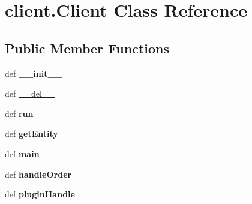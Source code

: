 \hypertarget{classclient_1_1_client}{\section{client.\-Client \-Class \-Reference}
\label{classclient_1_1_client}
}
\subsection*{\-Public \-Member \-Functions}
\begin{DoxyCompactItemize}
\item 
\hypertarget{classclient_1_1_client_a02d35b9c722c0434fda44d8b67274f8b}{def {\bfseries \-\_\-\-\_\-init\-\_\-\-\_\-}}\label{classclient_1_1_client_a02d35b9c722c0434fda44d8b67274f8b}

\item 
def \hyperlink{classclient_1_1_client_a81808356345d9f5b1c37200ce09a03cf}{\-\_\-\-\_\-del\-\_\-\-\_\-}
\item 
\hypertarget{classclient_1_1_client_a611a6aa5f1b60a60270b1cacc3522cb8}{def {\bfseries run}}\label{classclient_1_1_client_a611a6aa5f1b60a60270b1cacc3522cb8}

\item 
\hypertarget{classclient_1_1_client_aeff3316ccd3dc3efc6e216657ad11209}{def {\bfseries get\-Entity}}\label{classclient_1_1_client_aeff3316ccd3dc3efc6e216657ad11209}

\item 
\hypertarget{classclient_1_1_client_a29ca5ab810f2b176127fabe4a6e6e9f2}{def {\bfseries main}}\label{classclient_1_1_client_a29ca5ab810f2b176127fabe4a6e6e9f2}

\item 
\hypertarget{classclient_1_1_client_a411fe3cb0e6bd641925c600482025075}{def {\bfseries handle\-Order}}\label{classclient_1_1_client_a411fe3cb0e6bd641925c600482025075}

\item 
\hypertarget{classclient_1_1_client_ab33a0618c1e787648f00d5f36cb4fec8}{def {\bfseries plugin\-Handle}}\label{classclient_1_1_client_ab33a0618c1e787648f00d5f36cb4fec8}

\end{DoxyCompactItemize}
